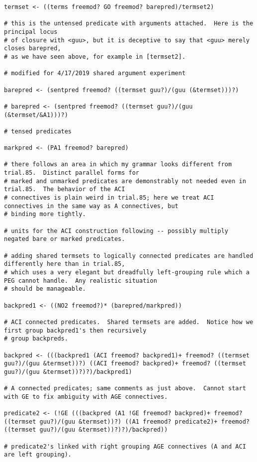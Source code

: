 \documentclass{article}
\begin{document}
\begin{verbatim}
termset <- ((terms freemod? GO freemod? barepred)/termset2)

# this is the untensed predicate with arguments attached.  Here is the principal locus
# of closure with <guu>, but it is deceptive to say that <guu> merely closes barepred,
# as we have seen above, for example in [termset2].

# modified for 4/17/2019 shared argument experiment

barepred <- (sentpred freemod? ((termset guu?)/(guu (&termset)))?)

# barepred <- (sentpred freemod? ((termset guu?)/(guu (&termset/&A1)))?)

# tensed predicates

markpred <- (PA1 freemod? barepred)

# there follows an area in which my grammar looks different from trial.85.  Distinct parallel forms for
# marked and unmarked predicates are demonstrably not needed even in trial.85.  The behavior of the ACI
# connectives is plain weird in trial.85; here we treat ACI connectives in the same way as A connectives, but
# binding more tightly.

# units for the ACI construction following -- possibly multiply negated bare or marked predicates.

# adding shared termsets to logically connected predicates are handled differently here than in trial.85,
# which uses a very elegant but dreadfully left-grouping rule which a PEG cannot handle.  Any realistic situation
# should be manageable.

backpred1 <- ((NO2 freemod?)* (barepred/markpred))

# ACI connected predicates.  Shared termsets are added.  Notice how we first group backpred1's then recursively
# group backpreds.

backpred <- (((backpred1 (ACI freemod? backpred1)+ freemod? ((termset guu?)/(guu &termset))?) ((ACI freemod? backpred)+ freemod? ((termset guu?)/(guu &termset))?)?)/backpred1)

# A connected predicates; same comments as just above.  Cannot start with GE to fix ambiguity with AGE connectives.

predicate2 <- (!GE (((backpred (A1 !GE freemod? backpred)+ freemod? ((termset guu?)/(guu &termset))?) ((A1 freemod? predicate2)+ freemod? ((termset guu?)/(guu &termset))?)?)/backpred))

# predicate2's linked with right grouping AGE connectives (A and ACI are left grouping).


\end{verbatim}
\end{document}

